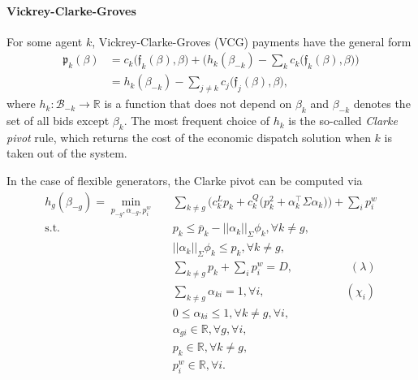 \documentclass{article}
\begin{document}
\paragraph{Vickrey-Clarke-Groves}

For some agent $k$, Vickrey-Clarke-Groves (VCG) payments have the general form
\begin{align*}
\mathfrak{p}_k(\beta) &= c_k\big(\mathfrak{f}_k(\beta), \beta \big) + \Big(h_k(\beta_{-k}) - \sum_{k} c_k\big(\mathfrak{f}_k(\beta), \beta \big) \Big)\\
&= h_k(\beta_{-k}) - \sum_{j \ne k} c_j\big(\mathfrak{f}_j(\beta), \beta\big),
\end{align*}
where $h_k: \mathcal{B}_{-k} \rightarrow \mathbb{R}$ is a function that does not depend on $\beta_k$ and $\beta_{-k}$ denotes the set of all bids except $\beta_k$. The most frequent choice of $h_k$ is the so-called \textit{Clarke pivot} rule, which returns the cost of the economic dispatch solution when $k$ is taken out of the system.

In the case of flexible generators, the Clarke pivot can be computed via
\begin{align*}
h_g(\beta_{-g}) = \underset{p_{-g}, \alpha_{-g}, p_i^w}{\min} \hspace{10pt} & \sum_{k \ne g} \Big(c_k^L p_k+ c_k^Q \big(p_k ^2 + \alpha_k^\top \Sigma \alpha_k\big)\Big) + \sum_i p_i^w \\
\mbox{s.t. } & p_k \le \overline{p}_k - ||\alpha_k||_{\Sigma} \phi_k,\forall k \ne g,\\
& ||\alpha_k||_{\Sigma} \phi_k \le p_k,\forall k \ne g,\\
& \sum_{k \ne g} p_k + \sum_i p_i^w = D, \hspace{60pt} (\lambda)\\
& \sum_{k \ne g} \alpha_{ki} = 1, \forall i, \hspace{85pt} (\chi_i)\\
& 0 \le \alpha_{ki} \le 1, \forall k \ne g, \forall i,\\
& \alpha_{gi} \in \mathbb{R}, \forall g, \forall i,\\
& p_k \in \mathbb{R}, \forall k \ne g,\\
& p_i^w \in \mathbb{R}, \forall i.
\end{align*}
\end{document}
